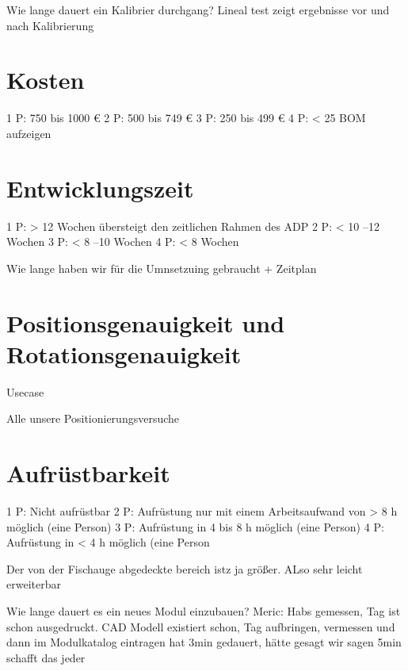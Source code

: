 Wie lange dauert ein Kalibrier durchgang?
Lineal test zeigt ergebnisse vor und nach Kalibrierung

\section{Kosten}
\label{sec:Kosten_Verifikation}
1 P: 750 bis 1000 €
2 P: 500 bis 749 €
3 P: 250 bis 499 €
4 P: < 25
BOM aufzeigen

\section{Entwicklungszeit}
\label{sec:Entwicklungszeit_Verifikation}
1 P: > 12 Wochen übersteigt den zeitlichen Rahmen des ADP
2 P: < 10 --12 Wochen
3 P: < 8 --10 Wochen
4 P: < 8 Wochen

Wie lange haben wir für die Umnsetzuing gebraucht + Zeitplan

\section{Positionsgenauigkeit und Rotationsgenauigkeit}
\label{sec:Positionsgenauigkeit und Rotationsgenauigkeit_Verifikation}
Usecase

Alle unsere Positionierungsversuche


\section{Aufrüstbarkeit}
\label{sec:Aufrüstbarkeit_Verifikation}
1 P: Nicht aufrüstbar
2 P: Aufrüstung nur mit einem Arbeitsaufwand von > 8 h möglich (eine
Person)
3 P: Aufrüstung in 4 bis 8 h möglich (eine Person)
4 P: Aufrüstung in < 4 h möglich (eine Person

Der von der Fischauge abgedeckte bereich istz ja größer. ALso sehr leicht erweiterbar

Wie lange dauert es ein neues Modul einzubauen?
Meric: Habs gemessen, Tag ist schon ausgedruckt. CAD Modell existiert schon, Tag aufbringen, vermessen und dann im Modulkatalog eintragen hat 3min gedauert, hätte gesagt wir sagen 5min schafft das jeder






